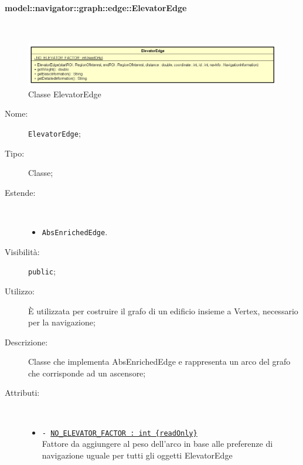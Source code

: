 \documentclass[../DefinizioneDiProdotto.tex]{subfiles}
\begin{document}
\paragraph{model::navigator::graph::edge::ElevatorEdge}
\
\begin{figure}[H]
	\centering
	\includegraphics[width=\maxwidth]{img/ElevatorEdge.png}
	\caption{Classe ElevatorEdge}\label{fig:model::navigator::graph::edge::ElevatorEdge} 
\end{figure}
\begin{description}
	\item[Nome:] \texttt{ElevatorEdge};
	\item[Tipo:] Classe;
	\item[Estende:] \
	\begin{itemize}
		\item \texttt{AbsEnrichedEdge}.
	\end{itemize}
	\item[Visibilità:] \texttt{public};
	\item[Utilizzo:] È utilizzata per costruire il grafo di un edificio insieme a Vertex, necessario per la navigazione;
	\item[Descrizione:] Classe che implementa AbsEnrichedEdge e rappresenta un arco del grafo che corrisponde ad un ascensore;
	\item[Attributi:] \
	\begin{itemize}
		\item \texttt{- \underline{NO\_ELEVATOR\_FACTOR : int \{readOnly\}}}\\
		Fattore da aggiungere al peso dell'arco in base alle preferenze di navigazione uguale per tutti gli oggetti ElevatorEdge
		

\end{itemize}
\end{description}
\end{document}
